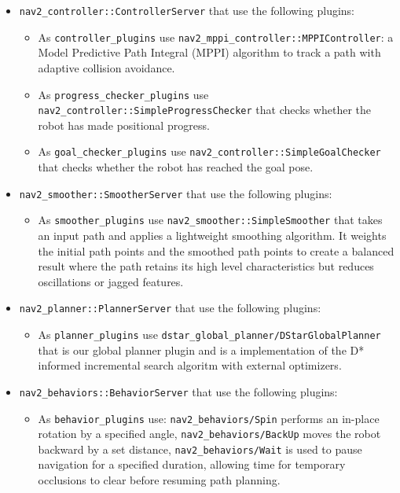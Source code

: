 \begin{itemize}
	\item \texttt{nav2\_controller::ControllerServer} that use the following plugins:
	\begin{itemize}
		\item As \texttt{controller\_plugins} use \texttt{\alert{nav2\_mppi\_controller::MPPIController}}: a Model Predictive Path Integral (MPPI) algorithm to track a path with adaptive collision avoidance.
		
		\item As \texttt{progress\_checker\_plugins} use\\ \texttt{nav2\_controller::SimpleProgressChecker} that checks whether the robot has made positional progress.
		
		\item As \texttt{goal\_checker\_plugins} use \texttt{nav2\_controller::SimpleGoalChecker} that checks whether the robot has reached the goal pose.
	\end{itemize}
	
	\item \texttt{nav2\_smoother::SmootherServer} that use the following plugins:
	\begin{itemize}
		\item As \texttt{smoother\_plugins} use \texttt{nav2\_smoother::SimpleSmoother} that takes an input path and applies a lightweight smoothing algorithm. It weights the initial path points and the smoothed path points to create a balanced result where the path retains its high level characteristics but reduces oscillations or jagged features.
	\end{itemize}
	
	\item \texttt{nav2\_planner::PlannerServer} that use the following plugins:
	\begin{itemize}
		\item As \texttt{planner\_plugins} use  \texttt{dstar\_global\_planner\alert{/}DStarGlobalPlanner} that is our global planner plugin and is a implementation of the D* informed incremental search algoritm with external optimizers\cite{10.1007/978-3-031-67295-8_33}.
	\end{itemize}
	
	\item \texttt{nav2\_behaviors::BehaviorServer} that use the following plugins:
	\begin{itemize}
		\item As \texttt{behavior\_plugins} use:
		\texttt{nav2\_behaviors/Spin} performs an in-place rotation by a specified angle,
		\texttt{nav2\_behaviors/BackUp} moves the robot backward by a set distance,
		\texttt{nav2\_behaviors/Wait}  is used to pause navigation for a specified duration, allowing time for temporary occlusions to clear before resuming path planning.
	\end{itemize}
	

\end{itemize}
